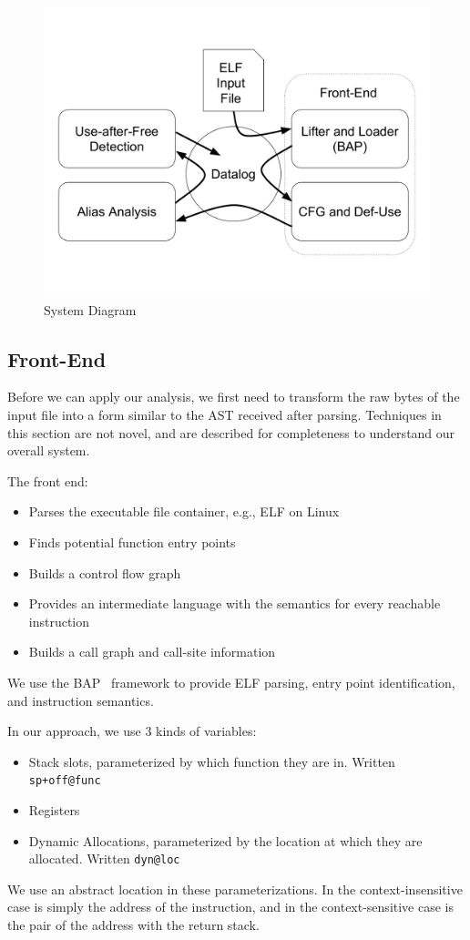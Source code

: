 \begin{figure}
	\centering\includegraphics[scale=0.3]{alias/system.pdf}
	\caption{System Diagram}
	\label{fig:system}
\end{figure}

\subsection{Front-End}
Before we can apply our analysis, we first need to transform the raw
bytes of the input file into a form similar to the AST received after
parsing.  Techniques in this section are not novel, and are described
for completeness to understand our overall system.

The front end:
\begin{itemize}
  \item Parses the executable file container, e.g., ELF on Linux
  \item Finds potential function entry points
  \item Builds a control flow graph
  \item Provides an intermediate language with the semantics for every reachable instruction
  \item Builds a call graph and call-site information
\end{itemize}

We use the BAP~\cite{bap} framework to provide ELF parsing, entry point identification, and instruction semantics.

In our approach, we use 3 kinds of variables:
\begin{itemize}
	\item Stack slots, parameterized by which function they are in. Written \texttt{sp+off@func}
	\item Registers
	\item Dynamic Allocations, parameterized by the location at which they are allocated. Written \texttt{dyn@loc}
\end{itemize}
We use an abstract location in these parameterizations.
In the context-insensitive case is simply the address of the instruction, and in the context-sensitive case is the pair of the address with the return stack.


